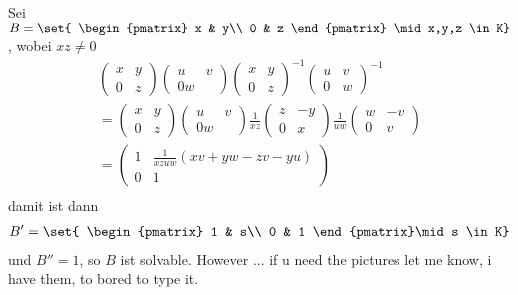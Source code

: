 \begin{*example}
	Sei $B = \set{
		\begin{pmatrix}
			x & y\\ 0 & z
		\end{pmatrix} \mid x,y,z \in K}$, wobei $xz \neq 0$
	\begin{align*}
		\begin{pmatrix}
			x & y\\ 0 & z
		\end{pmatrix}
		\begin{pmatrix}
			u & v\\ 0 w
		\end{pmatrix}
		\begin{pmatrix}
			x & y\\ 0 & z
		\end{pmatrix}^{-1}
		\begin{pmatrix}
			u & v\\ 0 & w
		\end{pmatrix}^{-1}\\
		= \begin{pmatrix}
		x & y\\ 0 & z
		\end{pmatrix}
		\begin{pmatrix}
		u & v\\ 0 w
		\end{pmatrix}
		\frac{1}{xz}
		\begin{pmatrix}
			z & -y\\ 0 & x
		\end{pmatrix}
		\frac{1}{uw}
		\begin{pmatrix}
			w &-v\\0 & v
		\end{pmatrix}\\
		= \begin{pmatrix}
			1 & \frac{1}{xzuw}(xv + yw - zv - yu)\\
			0 & 1
		\end{pmatrix}\\
	\end{align*}
	damit ist dann
	\begin{align*}
		B' = \set{
			\begin{pmatrix}
				1 & s\\ 0 & 1
			\end{pmatrix}\mid s \in K}
	\end{align*}
	und $B'' = 1$, so $B$ ist solvable. However ... if u need the pictures let me know, i have them, to bored to type it.
	
\end{*example}
